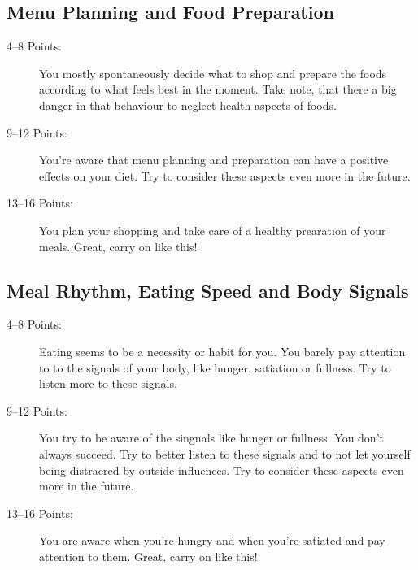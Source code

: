 \documentclass[../main.tex]{subfiles}
\begin{document}
\subsection{Menu Planning and Food Preparation}

\begin{description}
\item[4--8 Points:]  You mostly spontaneously decide what to shop and prepare the foods according to what feels best in the moment.
Take note, that there a big danger in that behaviour to neglect health aspects of foods.
\item[9--12 Points:] You're aware that menu planning and preparation can have a positive effects on your diet.
  Try to consider these aspects even more in the future.
\item[13--16 Points:] You plan your shopping and take care of a healthy prearation of your meals.
  Great, carry on like this!
\end{description}


\subsection{Meal Rhythm, Eating Speed and Body Signals}

\begin{description}
\item[4--8 Points:]  Eating seems to be a necessity or habit for you.
  You barely pay attention to to the signals of your body, like hunger, satiation or fullness. Try to listen more to these signals.
\item[9--12 Points:] You try to be aware of the singnals like hunger or fullness.
  You don't always succeed.
  Try to better listen to these signals and to not let yourself being distracred by outside influences.
  Try to consider these aspects even more in the future.
\item[13--16 Points:] You are aware when you're hungry and when you're satiated and pay attention to them.
  Great, carry on like this!
\end{description}
\end{document}
